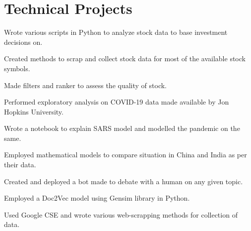 \documentclass[]{deedy-resume-openfont}
\begin{document}
\hfill
\begin{minipage}[t]{0.55\textwidth} 

\section{Technical Projects}

\vspace{\topsep} %
\begin{tightemize}
\item Wrote various scripts in Python to analyze stock data to base investment decisions on.
\item Created methods to scrap and collect stock data for most of the available stock symbols.
\item Made filters and ranker to assess the quality of stock.
\end{tightemize}
\sectionsep

\begin{tightemize}
\item Performed exploratory analysis on COVID-19 data made available by Jon Hopkins University.
\item Wrote a notebook to explain SARS model and modelled the pandemic on the same.
\item Employed mathematical models to compare situation in China and India as per their data.
\end{tightemize}
\sectionsep

\begin{tightemize}
\item Created and deployed a bot made to debate with a human on any given topic.
\item Employed a Doc2Vec model using Gensim library in Python.
\item Used Google CSE and wrote various web-scrapping methods for collection of data.
\end{tightemize}
\sectionsep


\end{minipage}
\end{document}
